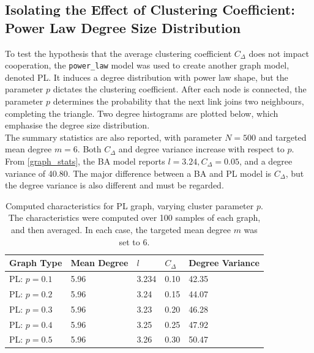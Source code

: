 \subsection{Isolating the Effect of Clustering Coefficient: Power Law Degree Size Distribution}
To test the hypothesis that the average clustering coefficient $C_\Delta$ does not impact cooperation, the \verb+power_law+ model was used to create another graph model, denoted PL. It induces a degree distribution with power law shape, but the parameter $p$ dictates the clustering coefficient. After each node is connected, the parameter $p$ determines the probability that the next link joins two neighbours, completing the triangle. Two degree histograms are plotted below, which emphasise the degree size distribution. \\
\FloatBarrier
{}
\FloatBarrier
{}
\FloatBarrier
The summary statistics are also reported, with parameter $N = 500$ and targeted mean degree $m=6$. Both $C_\Delta$ and degree variance increase with respect to $p$. From \ref{graph_stats}, the BA model reports $l=3.24, C_\Delta = 0.05$, and a degree variance of 40.80. The major difference between a BA and PL model is $C_\Delta$, but the degree variance is also different and must be regarded.   \\
\FloatBarrier
\begin{table}[!h]
\begin{center}
\begin{tabular}{|l|l|l|l|l|}
\hline
Graph Type & Mean Degree & $l$ & $C_\Delta$ & Degree Variance \\ \hline
PL: $p=0.1$        & 5.96        & 3.234                         & 0.10                   & 42.35           \\ \hline
PL: $p=0.2$        & 5.96           & 3.24                         & 0.15                   & 44.07               \\ \hline
PL: $p=0.3$       & 5.96        & 3.23                       & 0.20                   & 46.28           \\ \hline
PL: $p=0.4$       & 5.96        & 3.25                         & 0.25                   & 47.92           \\ \hline
PL: $p=0.5$         & 5.96           & 3.26                         & 0.30                   & 50.47            \\ \hline
\end{tabular}
\caption{Computed characteristics for PL graph, varying cluster parameter $p$. The characteristics were computed over 100 samples of each graph, and then averaged. In each case, the targeted mean degree $m$ was set to 6. } \label{graph_stats_PL}
\end{center}
\end{table}
